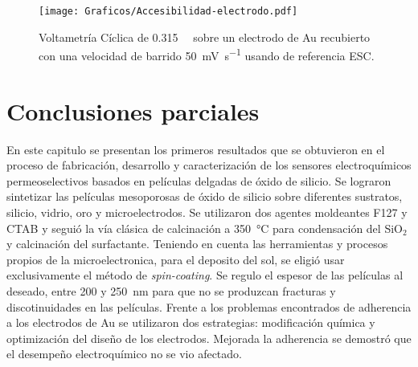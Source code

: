 						\begin{figure}[th]
				 	   	    \begin{center} 
				        	\texttt{[image: Graficos/Accesibilidad-electrodo.pdf]}
				       		\caption[Accesibilidad electrodo de trabajo.]{Voltametría Cíclica de \aminorutenio\space \SI{0.315}{\milli\Molar} sobre un electrodo de Au recubierto \pdmF\space con una velocidad de barrido \SI{50}{\milli\volt.\second^{-1}} usando de referencia ESC.}
				         	\label{fig:accesibilidad}
				     		\end{center}
				     		\end{figure}


\section{Conclusiones parciales}

En este capitulo se presentan los primeros resultados que se obtuvieron en el proceso de fabricación, desarrollo y caracterización de los sensores electroquímicos permeoselectivos basados en películas delgadas de óxido de silicio. Se lograron sintetizar las películas mesoporosas de óxido de silicio sobre diferentes sustratos, silicio, vidrio, oro y microelectrodos. Se utilizaron dos agentes moldeantes F127 y CTAB y seguió la vía clásica de calcinación a \SI{350}{\celsius} para condensación del SiO$_2$ y calcinación del surfactante. Teniendo en cuenta las herramientas y procesos propios de la microelectronica, para el deposito del sol, se eligió usar exclusivamente el método de \textit{spin-coating}. Se regulo el espesor de las películas al deseado, entre 200 y \SI{250}{\nm} para que no se produzcan fracturas y discotinuidades en las películas. Frente a los problemas encontrados de adherencia a los electrodos de Au se utilizaron dos estrategias: modificación química y optimización del diseño de los electrodos. Mejorada la adherencia se demostró que el desempeño electroquímico no se vio afectado. 

